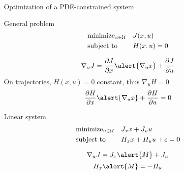 \begin{frame}{Optimization of a PDE-constrained system}
\small
\begin{minipage}[t]{0.44\textwidth}
\begin{block}{General problem}
\[
\begin{aligned}
&\text{minimize}_{u \in \mathcal{U}} && J(x,u) \\
&\text{subject to} &&H(x,u) = 0
\end{aligned}
\]
\end{block}
\vspace{-0.2cm}
\[
\nabla_u J = \frac{\partial J}{\partial x} \alert{\nabla_u x} + \frac{\partial J}{\partial u}
\]
On trajectories, $H(x, u) = 0$ constant, thus $\nabla_u H = 0$
\[
\frac{\partial H}{\partial x} \alert{\nabla_u x} + \frac{\partial H}{\partial u} = 0
\]
\vspace{-0.5cm}
\end{minipage}\hfill
\begin{minipage}[t]{0.52\textwidth}
\begin{block}{Linear system}
\[
\begin{aligned}
&\text{minimize}_{u \in \mathcal{U}} && J_x x + J_u u \\
&\text{subject to} && H_x x + H_u u + c = 0
\end{aligned}
\]
\end{block}
\vspace{-0.2cm}
\[
\nabla_u J = J_x \alert{M} + J_u
\]
\vspace{0.9cm}
\[
H_x \alert{M} = - H_u
\]
\end{minipage}



\end{frame}


